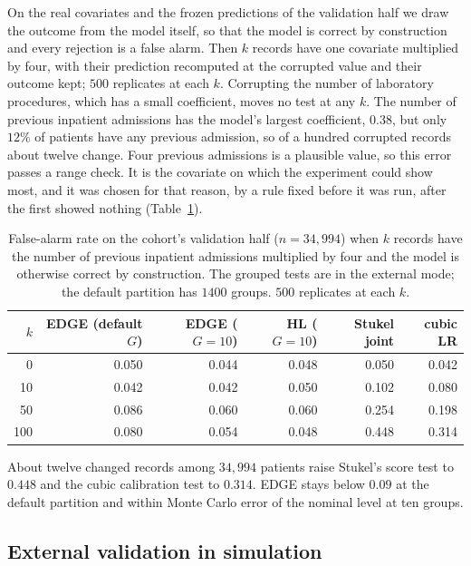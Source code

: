 On the real covariates and the frozen predictions of the validation half we draw the outcome from the
model itself, so that the model is correct by construction and every rejection is a false alarm. Then
$k$ records have one covariate multiplied by four, with their prediction recomputed at the corrupted
value and their outcome kept; $500$ replicates at each $k$. Corrupting the number of laboratory
procedures, which has a small coefficient, moves no test at any $k$. The number of previous inpatient
admissions has the model's largest coefficient, $0.38$, but only $12\%$ of patients have any previous
admission, so of a hundred corrupted records about twelve change. Four previous admissions is a
plausible value, so this error passes a range check. It is the covariate on which the experiment could
show most, and it was chosen for that reason, by a rule fixed before it was run, after the first showed
nothing (Table~\ref{tab:cohortcorrupt}).

\begin{table}[htbp]\centering\small
\caption{False-alarm rate on the cohort's validation half ($n=34{,}994$) when $k$ records have the
number of previous inpatient admissions multiplied by four and the model is otherwise correct by
construction. The grouped tests are in the external mode; the default partition has $1400$ groups.
$500$ replicates at each $k$.}
\label{tab:cohortcorrupt}
\begin{tabular}{rrrrrr}\hline
$k$ & EDGE (default $G$) & EDGE ($G{=}10$) & HL ($G{=}10$) & Stukel joint & cubic LR \\ \hline
0   & 0.050 & 0.044 & 0.048 & 0.050 & 0.042 \\
10  & 0.042 & 0.042 & 0.050 & 0.102 & 0.080 \\
50  & 0.086 & 0.060 & 0.060 & 0.254 & 0.198 \\
100 & 0.080 & 0.054 & 0.048 & 0.448 & 0.314 \\ \hline
\end{tabular}
\end{table}

About twelve changed records among $34{,}994$ patients raise Stukel's score test to $0.448$ and the
cubic calibration test to $0.314$. EDGE stays below $0.09$ at the default partition and within Monte
Carlo error of the nominal level at ten groups.

\subsection{External validation in simulation}\label{sec:extval}

